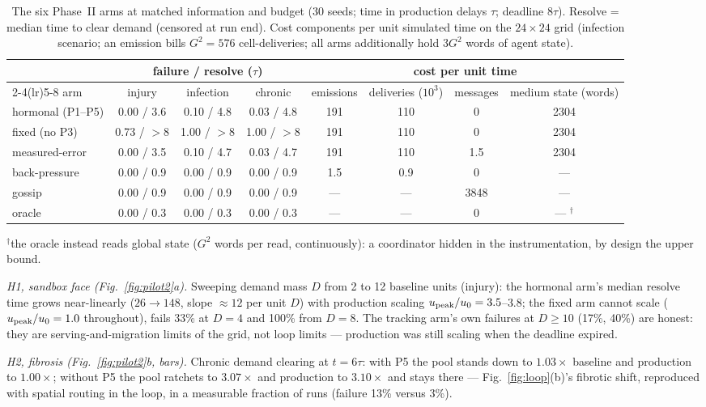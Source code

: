 \documentclass[twoside,twocolumn,usenatbib]{mnras}
\begin{document}
\begin{table}
\centering
\caption{The six Phase~II arms at matched information and budget
(30 seeds; time in production delays $\tau$; deadline $8\tau$).
Resolve = median time to clear demand (censored at run end).  Cost
components per unit simulated time on the $24\times24$ grid
(infection scenario; an emission bills $G^2 = 576$ cell-deliveries;
all arms additionally hold $3G^2$ words of agent state).}
\label{tab:arms}
\begin{tabular}{l ccc cccc}
\toprule
& \multicolumn{3}{c}{failure / resolve ($\tau$)} &
\multicolumn{4}{c}{cost per unit time} \\
\cmidrule(lr){2-4}\cmidrule(lr){5-8}
arm & injury & infection & chronic &
emissions & deliveries ($10^3$) & messages & medium state (words) \\
\midrule
hormonal (P1--P5) & 0.00 / 3.6 & 0.10 / 4.8 & 0.03 / 4.8 &
191 & 110 & 0 & 2304 \\
fixed (no P3) & 0.73 / $>8$ & 1.00 / $>8$ & 1.00 / $>8$ &
191 & 110 & 0 & 2304 \\
measured-error & 0.00 / 3.5 & 0.10 / 4.7 & 0.03 / 4.7 &
191 & 110 & 1.5 & 2304 \\
back-pressure & 0.00 / 0.9 & 0.00 / 0.9 & 0.00 / 0.9 &
1.5 & 0.9 & 0 & --- \\
gossip & 0.00 / 0.9 & 0.00 / 0.9 & 0.00 / 0.9 &
--- & --- & 3848 & --- \\
oracle & 0.00 / 0.3 & 0.00 / 0.3 & 0.00 / 0.3 &
--- & --- & 0 & --- $^{\dagger}$ \\
\bottomrule
\end{tabular}

$^{\dagger}$the oracle instead reads global state ($G^2$ words per
read, continuously): a coordinator hidden in the instrumentation, by
design the upper bound.
\end{table}

\emph{H1, sandbox face (Fig.~\ref{fig:pilot2}a).}  Sweeping demand
mass $D$ from 2 to 12 baseline units (injury): the hormonal arm's
median resolve time grows near-linearly ($26 \to 148$, slope
$\approx 12$ per unit $D$) with production scaling $u_{\rm peak}/u_0
= 3.5$--$3.8$; the fixed arm cannot scale ($u_{\rm peak}/u_0 = 1.0$
throughout), fails 33\% at $D=4$ and 100\% from $D = 8$.  The
tracking arm's own failures at $D \ge 10$ (17\%, 40\%) are honest:
they are serving-and-migration limits of the grid, not loop limits
--- production was still scaling when the deadline expired.

\emph{H2, fibrosis (Fig.~\ref{fig:pilot2}b, bars).}  Chronic demand
clearing at $t = 6\tau$: with P5 the pool stands down to $1.03\times$
baseline and production to $1.00\times$; without P5 the pool
ratchets to $3.07\times$ and production to $3.10\times$ and stays
there --- Fig.~\ref{fig:loop}(b)'s fibrotic shift, reproduced with
spatial routing in the loop, in a measurable fraction of runs
(failure 13\% versus 3\%).
\end{document}
